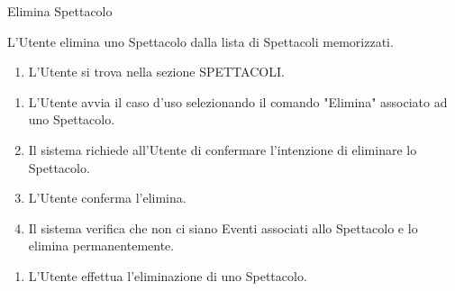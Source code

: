 {\ucExtTable	%
{	%
	Elimina Spettacolo
	
}{	%
	
}{	%
	L'Utente elimina uno Spettacolo dalla lista di Spettacoli memorizzati.
	
}{	%
	\attori
	
}{	%
	\begin{enumerate}
        \item L'Utente si trova nella sezione SPETTACOLI.
    \end{enumerate}
	
}{	%
	\begin{enumerate}
        \item L'Utente avvia il caso d'uso selezionando il comando "Elimina" associato ad uno Spettacolo.
        \item Il sistema richiede all'Utente di confermare l'intenzione di eliminare lo Spettacolo.
        \item L'Utente conferma l'elimina.
        \item Il sistema verifica che non ci siano Eventi associati allo Spettacolo e lo elimina permanentemente.
    \end{enumerate}
	
}{	%
	\begin{enumerate}
        \item L'Utente effettua l'eliminazione di uno Spettacolo.
    \end{enumerate}
	
} }

